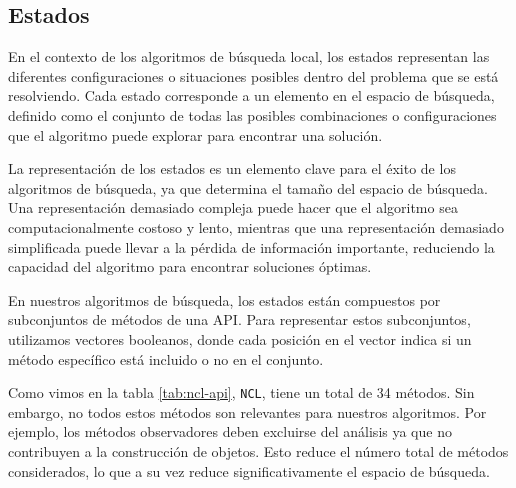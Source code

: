 \subsection{Estados}
\label{sec:estados}
En el contexto de los algoritmos de búsqueda local, los estados representan las diferentes configuraciones o situaciones posibles dentro del problema que se está resolviendo. Cada estado corresponde a un elemento en el espacio de búsqueda, definido como el conjunto de todas las posibles combinaciones o configuraciones que el algoritmo puede explorar para encontrar una solución.

La representación de los estados es un elemento clave para el éxito de los algoritmos de búsqueda, ya que determina el tamaño del espacio de búsqueda. 
Una representación demasiado compleja puede hacer que el algoritmo sea computacionalmente costoso y lento, mientras que una representación demasiado simplificada puede llevar a la pérdida de información importante, reduciendo la capacidad del algoritmo para encontrar soluciones óptimas.

En nuestros algoritmos de búsqueda, los estados están compuestos por subconjuntos de métodos de una API. Para representar estos subconjuntos, utilizamos vectores booleanos, donde cada posición en el vector indica si un método específico está incluido o no en el conjunto.

Como vimos en la tabla \ref{tab:ncl-api}, \texttt{NCL}, tiene un total de 34 métodos. Sin embargo, no todos estos métodos son relevantes para nuestros algoritmos. Por ejemplo, los métodos observadores deben excluirse del análisis ya que no contribuyen a la construcción de objetos. Esto reduce el número total de métodos considerados, lo que a su vez reduce significativamente el espacio de búsqueda.


